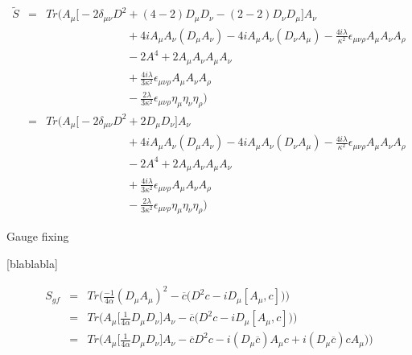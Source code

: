 \documentclass[10pt]{book}
\theoremstyle{break}
\begin{document}
\begin{eqnarray*}
 \tilde{S} &=& Tr \Bigg( 
 A_\mu \bigg[ - 2 \delta_{\mu \nu} D^2 + ( 4 - 2) D_\mu D_\nu - (2 - 2 ) D_\nu D_\mu \bigg] A_\nu \nonumber \\ 
 && \hspace{3cm} + 4i A_\mu A_\nu (D_\mu A_\nu) - 4i A_\mu A_\nu (D_\nu A_\mu) - \frac{4i\lambda}{\kappa^2} \epsilon_{\mu \nu \rho} A_\mu A_\nu A_\rho \nonumber \\
 && \hspace{3cm} - 2 A^4 + 2 A_\mu A_\nu A_\mu A_\nu \nonumber \\
 && \hspace{3cm} + \frac{4 i \lambda}{3 \kappa^2} \epsilon_{\mu \nu \rho} A_\mu A_\nu A_\rho \nonumber \\ 
 && \hspace{3cm} - \frac{2 \lambda}{3 \kappa^2} \epsilon_{\mu \nu \rho} \eta_{\mu} \eta_\nu \eta_\rho \Bigg) \nonumber \\
 &=& Tr \Bigg( 
 A_\mu \bigg[ - 2 \delta_{\mu \nu} D^2 + 2 D_\mu D_\nu \bigg] A_\nu \nonumber \\ 
 && \hspace{3cm} + 4i A_\mu A_\nu (D_\mu A_\nu) - 4i A_\mu A_\nu (D_\nu A_\mu) - \frac{4i\lambda}{\kappa^2} \epsilon_{\mu \nu \rho} A_\mu A_\nu A_\rho \nonumber \\
 && \hspace{3cm} - 2 A^4 + 2 A_\mu A_\nu A_\mu A_\nu \nonumber \\
 && \hspace{3cm} + \frac{4 i \lambda}{3 \kappa^2} \epsilon_{\mu \nu \rho} A_\mu A_\nu A_\rho \nonumber \\ 
 && \hspace{3cm} - \frac{2 \lambda}{3 \kappa^2} \epsilon_{\mu \nu \rho} \eta_{\mu} \eta_\nu \eta_\rho \Bigg)
\end{eqnarray*}

Gauge fixing


[blablabla]

\begin{eqnarray*}
 S_{gf} &=& Tr \bigg( \frac{-1}{4 \alpha} (D_\mu A_\mu)^2 - \overline{c} \big( D^2 c - i D_\mu [A_\mu , c] \big) \bigg) \nonumber \\
 &=& Tr \bigg( A_\mu \bigg[ \frac{1}{4 \alpha} D_\mu D_\nu \bigg] A_\nu - \overline{c} \big( D^2 c - i D_\mu [A_\mu , c] \big) \bigg) \nonumber \\
 &=& Tr \bigg( A_\mu \bigg[ \frac{1}{4 \alpha} D_\mu D_\nu \bigg] A_\nu - \overline{c} D^2 c - i ( D_\mu \overline{c} ) A_\mu c + i ( D_\mu \overline{c} ) c A_\mu \big) \bigg)
\end{eqnarray*}
\end{document}
